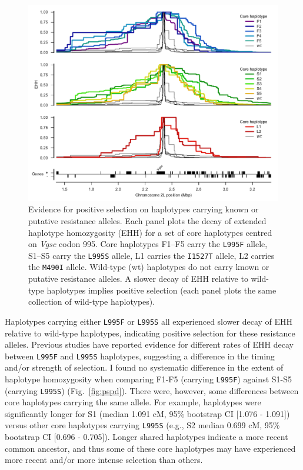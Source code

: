 \begin{refsection}
\begin{figure}[t!]
\centering
\includegraphics[width=1\linewidth,center]{artwork/chapter6/ehh.pdf}
\caption{Evidence for positive selection on haplotypes carrying known or putative resistance alleles.
%
Each panel plots the decay of extended haplotype homozygosity (EHH) for a set of core haplotypes centred on \textit{Vgsc} codon 995.
%
Core haplotypes F1--F5 carry the \texttt{L995F} allele, S1--S5 carry the \texttt{L995S} allele, L1 carries the \texttt{I1527T} allele, L2 carries the \texttt{M490I} allele.
%
Wild-type (wt) haplotypes do not carry known or putative resistance alleles.
%
A slower decay of EHH relative to wild-type haplotypes implies positive selection (each panel plots the same collection of wild-type haplotypes).
}
\label{fig:ehh}
\end{figure}


Haplotypes carrying either \texttt{L995F} or \texttt{L995S} all experienced slower decay of EHH relative to wild-type haplotypes, indicating positive selection for these resistance alleles.
%
Previous studies have reported evidence for different rates of EHH decay between \texttt{L995F} and \texttt{L995S} haplotypes, suggesting a difference in the timing and/or strength of selection.
%
I found no systematic difference in the extent of haplotype homozygosity when comparing F1-F5 (carrying \texttt{L995F}) against S1-S5 (carrying \texttt{L995S}) (Fig.~\ref{fig:pspd}).
%
There were, however, some differences between core haplotypes carrying the same allele.
%
For example, haplotypes were significantly longer for S1 (median 1.091 cM, 95\% bootstrap CI [1.076 - 1.091]) versus other core haplotypes carrying \texttt{L995S} (e.g., S2 median 0.699 cM, 95\% bootstrap CI [0.696 - 0.705]).
%
Longer shared haplotypes indicate a more recent common ancestor, and thus some of these core haplotypes may have experienced more recent and/or more intense selection than others.



\end{refsection}

